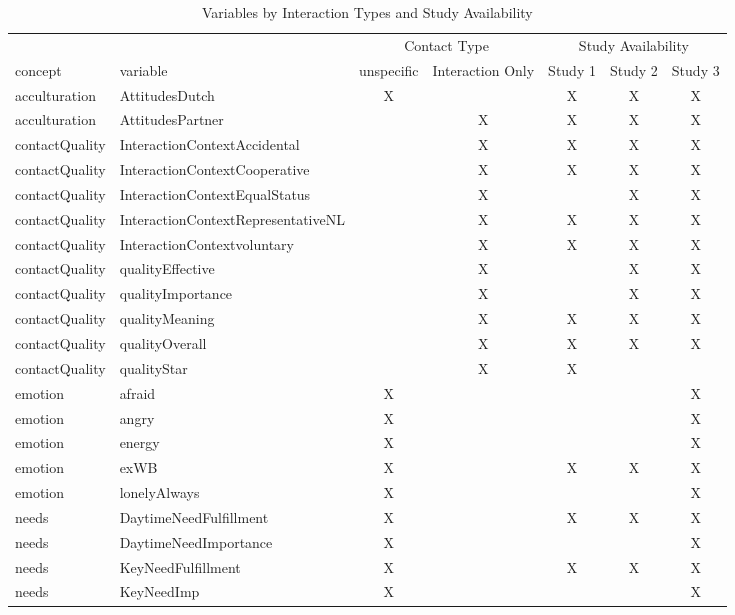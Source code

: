 \documentclass[
]{article}
\begin{document}
\begin{table}

\caption{\label{tab:variable names by response type and study}Variables by Interaction Types and Study Availability}
\centering
\begin{tabular}[t]{llccccc}
\toprule
\multicolumn{2}{c}{ } & \multicolumn{2}{c}{Contact Type} & \multicolumn{3}{c}{Study Availability} \\
\cmidrule(l{3pt}r{3pt}){3-4} \cmidrule(l{3pt}r{3pt}){5-7}
concept & variable & unspecific & Interaction Only & Study 1 & Study 2 & Study 3\\
\midrule
acculturation & AttitudesDutch & X &  & X & X & X\\
acculturation & AttitudesPartner &  & X & X & X & X\\
contactQuality & InteractionContextAccidental &  & X & X & X & X\\
contactQuality & InteractionContextCooperative &  & X & X & X & X\\
contactQuality & InteractionContextEqualStatus &  & X &  & X & X\\
\addlinespace
contactQuality & InteractionContextRepresentativeNL &  & X & X & X & X\\
contactQuality & InteractionContextvoluntary &  & X & X & X & X\\
contactQuality & qualityEffective &  & X &  & X & X\\
contactQuality & qualityImportance &  & X &  & X & X\\
contactQuality & qualityMeaning &  & X & X & X & X\\
\addlinespace
contactQuality & qualityOverall &  & X & X & X & X\\
contactQuality & qualityStar &  & X & X &  & \\
emotion & afraid & X &  &  &  & X\\
emotion & angry & X &  &  &  & X\\
emotion & energy & X &  &  &  & X\\
\addlinespace
emotion & exWB & X &  & X & X & X\\
emotion & lonelyAlways & X &  &  &  & X\\
needs & DaytimeNeedFulfillment & X &  & X & X & X\\
needs & DaytimeNeedImportance & X &  &  &  & X\\
needs & KeyNeedFulfillment & X &  & X & X & X\\
\addlinespace
needs & KeyNeedImp & X &  &  &  & X\\

\end{tabular}
\end{table}
\end{document}
